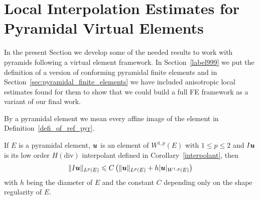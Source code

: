 \section{Local Interpolation Estimates for Pyramidal Virtual Elements}
In the present Section we develop some of the needed results to work
with pyramids following a virtual element framework. In Section~\ref{label999} we 
put the definition of a version of conforming pyramidal finite elements and 
in Section~\ref{sec:pyramidal_finite_elements}
we have included anisotropic local estimates found  for them to show that we could
build a full FE framework as a variant of our final work.  

By a pyramidal element we mean every affine image of the element in
Definition~\ref{defi_of_ref_pyr}.
\begin{lemma}\label{auxlabel6}
If $E$ is a pyramidal element, $\boldsymbol{u}$ is an element of $W^{1,p}(E)$ with 
$1\leqslant p\leqslant 2$
and $I\boldsymbol{u}$ is its low order $H(\text{div})$ interpolant defined in Corollary~\ref{interpolant},
then
\begin{equation}\label{estab2}
\|I\boldsymbol{u}\|_{L^p(E)}\leqslant C\left(\|\boldsymbol{u}\|_{L^p(E)}+ h|\boldsymbol{u}|_{W^{1,p}(E)}\right)
\end{equation}
with $h$ being the diameter of $E$ and the constant $C$ depending only on the shape regularity of $E$.
\end{lemma}
